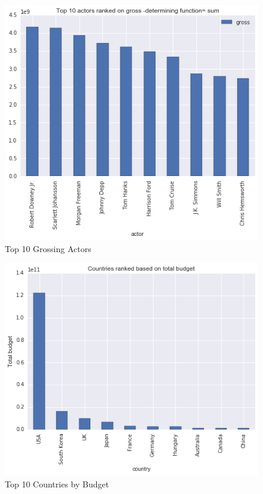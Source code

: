 \documentclass{article}%
\begin{document}
\begin{figure}
\centering
\includegraphics[width=1.0\columnwidth]{Fig/Top10actorsbasedongross.png}
\caption{Top 10 Grossing Actors}
\label{fig:Top10actorsbasedongross}
\end{figure}

\begin{figure}
\centering
\includegraphics[width=1.0\columnwidth]{Fig/crfm.png}
\caption{Top 10 Countries by Budget}
\label{fig:crfm}
\end{figure}
\end{document}
